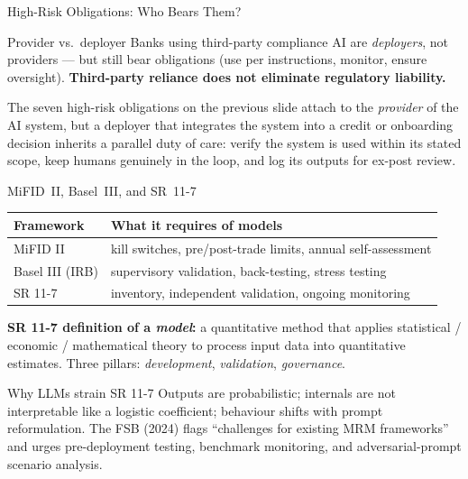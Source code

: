 \documentclass[9pt,t]{beamer}
\begin{document}
\begin{frame}{High-Risk Obligations: Who Bears Them?}
\begin{block}{Provider vs.\ deployer}
Banks using third-party compliance AI are \emph{deployers}, not providers --- but
still bear obligations (use per instructions, monitor, ensure oversight).
\textbf{Third-party reliance does not eliminate regulatory liability.}
\end{block}

\medskip
The seven high-risk obligations on the previous slide attach to the
\emph{provider} of the AI system, but a deployer that integrates the system into
a credit or onboarding decision inherits a parallel duty of care: verify the
system is used within its stated scope, keep humans genuinely in the loop, and
log its outputs for ex-post review.
\end{frame}

\begin{frame}{MiFID~II, Basel~III, and SR~11-7}
\begin{tabular}{ll}
\toprule
\textbf{Framework} & \textbf{What it requires of models} \\
\midrule
MiFID II & kill switches, pre/post-trade limits, annual self-assessment \\
Basel III (IRB) & supervisory validation, back-testing, stress testing \\
SR 11-7 & inventory, independent validation, ongoing monitoring \\
\bottomrule
\end{tabular}

\medskip
\textbf{SR 11-7 definition of a \emph{model}:} a quantitative method that applies
statistical / economic / mathematical theory to process input data into
quantitative estimates. Three pillars: \emph{development}, \emph{validation},
\emph{governance}.

\begin{alertblock}{Why LLMs strain SR 11-7}
Outputs are probabilistic; internals are not interpretable like a logistic
coefficient; behaviour shifts with prompt reformulation. The FSB (2024) flags
``challenges for existing MRM frameworks'' and urges pre-deployment testing,
benchmark monitoring, and adversarial-prompt scenario analysis.
\end{alertblock}
\end{frame}
\end{document}
